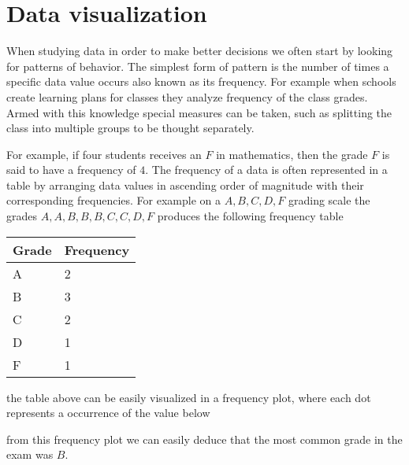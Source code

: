 \section{Data visualization}
When studying data in order to make better decisions we often start by looking for patterns of behavior. The simplest form of pattern is the number of times a specific data value occurs also known as its frequency. For example when schools create learning plans for classes they analyze frequency of the class grades. Armed with this knowledge special measures can be taken, such as splitting the class into multiple groups to be thought separately.

For example, if four students receives an $F$ in mathematics, then the grade $F$ is said to have a frequency of $4$. The frequency of a data is often represented in a table by arranging data values in ascending order of magnitude with their corresponding frequencies. For example on a $A, B, C, D, F$ grading scale the grades $A, A, B, B, B, C, C, D, F$ produces the following frequency table
\begin{table}[H]
\centering
\begin{tabular}{|l|l|}
\hline
\textbf{Grade} & \textbf{Frequency} \\ \hline
A              & 2                  \\ \hline
B              & 3                  \\ \hline
C              & 2                  \\ \hline
D              & 1                  \\ \hline
F              & 1                  \\ \hline
\end{tabular}
\end{table}
the table above can be easily visualized in a frequency plot, where each dot represents a occurrence of the value below
\begin{figure}[H]
\centering
{}
\end{figure}
from this frequency plot we can easily deduce that the most common grade in the exam was $B$.

